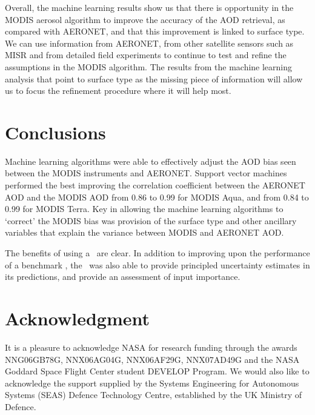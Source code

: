 \documentclass[journal]{IEEEtran}
\begin{document}
Overall, the machine learning results show us that there is opportunity in the MODIS aerosol algorithm to improve the accuracy of the AOD retrieval, as compared with AERONET, and that this improvement is linked to surface type.  We can use information from AERONET, from other satellite sensors such as MISR and from detailed field experiments to continue to test and refine the assumptions in the MODIS algorithm.  The results from the machine learning analysis that point to surface type as the missing piece of information will allow us to focus the refinement procedure where it will help most.

\section{Conclusions \label{Section.Conclusions}}

Machine learning algorithms were able to effectively adjust the AOD bias seen between the MODIS instruments and AERONET. Support vector machines performed the best improving the correlation coefficient between the AERONET AOD and the MODIS AOD from 0.86 to 0.99 for MODIS Aqua, and from 0.84 to 0.99 for MODIS Terra. Key in allowing the machine learning algorithms to \lq correct' the MODIS bias was provision of the surface type and other ancillary variables that explain the variance between MODIS and AERONET AOD.

The benefits of using a \gp\ are clear. In addition to improving upon the performance of a benchmark \svm, the \gp\ was also able to provide principled uncertainty estimates in its predictions, and provide an assessment of input importance.


\appendices
\section*{Acknowledgment}

It is a pleasure to acknowledge NASA for research funding through the awards NNG06GB78G, NNX06AG04G, NNX06AF29G, NNX07AD49G and the NASA Goddard Space Flight Center student DEVELOP Program. We would also like to acknowledge the support supplied by the Systems Engineering for Autonomous Systems (SEAS) Defence Technology Centre, established by the UK Ministry of Defence.



\end{document}

